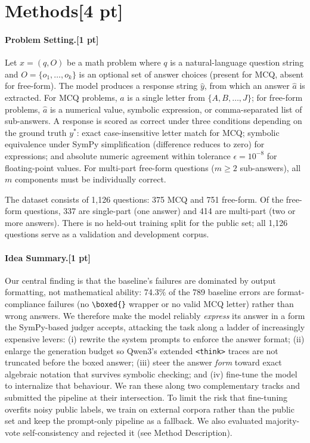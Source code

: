 \documentclass{article}
\begin{document}
\section{Methods[4 pt]}
\label{sec:methods}

\paragraph{Problem Setting.[1 pt]}
Let $x = (q, O)$ be a math problem where $q$ is a natural-language question string and $O = \{o_1, \ldots, o_k\}$ is an optional set of answer choices (present for MCQ, absent for free-form). The model produces a response string $\hat{y}$, from which an answer $\hat{a}$ is extracted. For MCQ problems, $\hat{a}$ is a single letter from $\{A, B, \ldots, J\}$; for free-form problems, $\hat{a}$ is a numerical value, symbolic expression, or comma-separated list of sub-answers. A response is scored as correct under three conditions depending on the ground truth $y^*$: exact case-insensitive letter match for MCQ; symbolic equivalence under SymPy simplification (difference reduces to zero) for expressions; and absolute numeric agreement within tolerance $\epsilon = 10^{-8}$ for floating-point values. For multi-part free-form questions ($m \geq 2$ sub-answers), all $m$ components must be individually correct.

The dataset consists of 1,126 questions: 375 MCQ and 751 free-form. Of the free-form questions, 337 are single-part (one answer) and 414 are multi-part (two or more answers). There is no held-out training split for the public set; all 1,126 questions serve as a validation and development corpus.

\paragraph{Idea Summary.[1 pt]}
Our central finding is that the baseline's failures are dominated by {output formatting},
not mathematical ability: 74.3\% of the 789 baseline errors are format-compliance failures
(no \texttt{\textbackslash boxed\{\}} wrapper or no valid MCQ letter) rather than wrong answers.
We therefore make the model reliably \emph{express} its answer in a form the SymPy-based judger
accepts, attacking the task along a ladder of increasingly expensive levers: (i) rewrite the system
prompts to enforce the answer format; (ii) enlarge the generation budget so Qwen3's extended
\texttt{<think>} traces are not truncated before the boxed answer; (iii) steer the answer
\emph{form} toward exact algebraic notation that survives symbolic checking; and (iv) fine-tune the
model to internalize that behaviour. We ran these along two complementary tracks and submitted the
pipeline at their intersection. To limit the risk that fine-tuning overfits noisy public labels, we
train on external corpora rather than the public set and keep the prompt-only pipeline as a fallback.
We also evaluated majority-vote self-consistency and rejected it (see Method Description).
\end{document}
